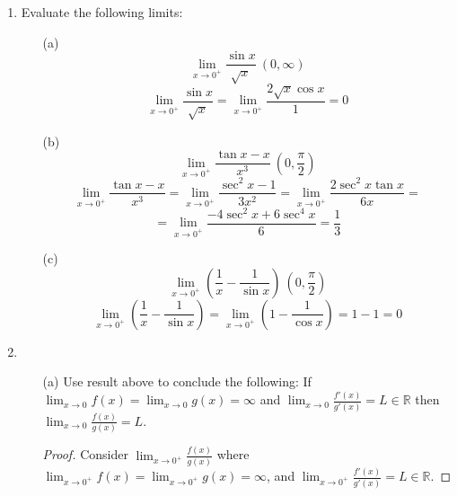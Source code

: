 \documentclass[hidelinks,12pt]{article}
\newcommand{\R}{\mathbb{R}}
\begin{document}
\begin{enumerate}
\begin{proof}
    \end{proof}
    \item Evaluate the following limits:\begin{itemize}
        \item[(a)] $$\lim_{x\to0^+}\frac{\sin x}{\sqrt{x}}\ \left(0,\infty\right)$$ $$\lim_{x\to0^+}\frac{\sin x}{\sqrt{x}}=\lim_{x\to0^+}\frac{2\sqrt{x}\cos x}{1}=0$$
        \item[(b)] $$\lim_{x\to0^+}\frac{\tan x-x}{x^3}\ \left(0,\frac{\pi}{2}\right)$$ $$\lim_{x\to0^+}\frac{\tan x-x}{x^3}=\lim_{x\to0^+}\frac{\sec^2x-1}{3x^2}=\lim_{x\to0^+}\frac{2\sec^2x\tan x}{6x}=$$ $$=\lim_{x\to0^+}\frac{-4\sec^2x+6\sec^4x}{6}=\frac{1}{3}$$
        \item[(c)] $$\lim_{x\to0^+}\left(\frac{1}{x}-\frac{1}{\sin x}\right)\ \left(0,\frac{\pi}{2}\right)$$ $$\lim_{x\to0^+}\left(\frac{1}{x}-\frac{1}{\sin x}\right)=\lim_{x\to0^+}\left(1-\frac{1}{\cos x}\right)=1-1=0$$
    \end{itemize}
    \item \begin{enumerate} If $\lim_{x\to\infty}f(x)=\lim_{x\to\infty}g(x)=\infty$ and $\lim_{x\to\infty}\frac{f'(x)}{g'(x)}=L\in\R$, then $\lim_{x\to\infty}\frac{f(x)}{g(x)}=L$.
        \item[(a)] Use result above to conclude the following: If $\lim_{x\to0}f(x)=\lim_{x\to0}g(x)=\infty$ and $\lim_{x\to0}\frac{f'(x)}{g'(x)}=L\in\R$ then $\lim_{x\to0}\frac{f(x)}{g(x)}=L$.\begin{proof}
            Consider $\lim_{x\to0^+}\frac{f(x)}{g(x)}$ where $\lim_{x\to0^+}f(x)=\lim_{x\to0^+}g(x)=\infty$, and $\lim_{x\to0^+}\frac{f'(x)}{g'(x)}=L\in\R$. 
        \end{proof}
    \end{enumerate}
\end{enumerate}
\end{document}
